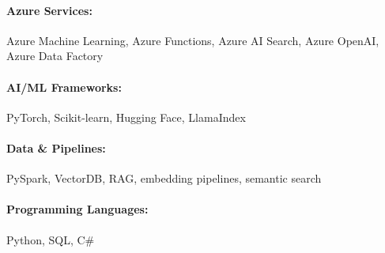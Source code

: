 \documentclass[10pt, letterpaper]{article}
\newenvironment{highlights}{
    \begin{itemize}[
        topsep=0.10 cm,
        parsep=0.10 cm,
        partopsep=0pt,
        itemsep=0pt,
        leftmargin=0 cm + 10pt
    ]
}{
    \end{itemize}
} %
\newenvironment{onecolentry}{
    \begin{adjustwidth}{
        0 cm + 0.00001 cm
    }{
        0 cm + 0.00001 cm
    }
}{
    \end{adjustwidth}
} %
\begin{document}
        \paragraph{Azure Services:} Azure Machine Learning, Azure Functions, Azure AI Search, Azure OpenAI, Azure Data Factory
        \vspace{-4mm}
        \paragraph{AI/ML Frameworks:} PyTorch, Scikit-learn, Hugging Face, LlamaIndex
        \vspace{-4mm}
        \paragraph{Data \& Pipelines:} PySpark, VectorDB, RAG, embedding pipelines, semantic search
        \vspace{-4mm}
        \paragraph{Programming Languages:} Python, SQL, C\#

    
        

\end{document}
